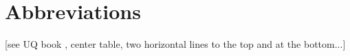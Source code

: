 

\section*{Abbreviations} %
\thispagestyle{plain} %


[see UQ book , center table, two horizontal lines to the top and at the bottom...]